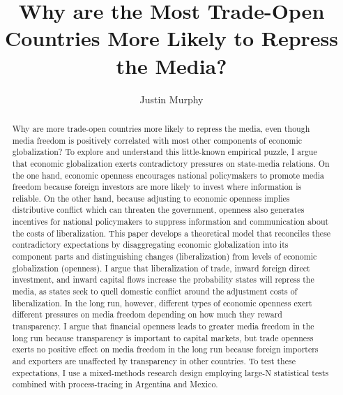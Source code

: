 \documentclass[12pt,a4paper]{article}\usepackage[]{graphicx}\usepackage[]{color}
\begin{document}
\title{Why are the Most Trade-Open Countries More Likely to Repress the Media?}

\author{Justin Murphy}

\maketitle

\begin{singlespace}
\begin{abstract}
Why are more trade-open countries more likely to repress the media, even though media freedom is positively correlated with most other components of economic globalization? To explore and understand this little-known empirical puzzle, I argue that economic globalization exerts contradictory pressures on state-media relations. On the one hand, economic openness encourages national policymakers to promote media freedom because foreign investors are more likely to invest where information is reliable. On the other hand, because adjusting to economic openness implies distributive conflict which can threaten the government, openness also generates incentives for national policymakers to suppress information and communication about the costs of liberalization. This paper develops a theoretical model that reconciles these contradictory expectations by disaggregating economic globalization into its component parts and distinguishing changes (liberalization) from levels of economic globalization (openness). I argue that liberalization of trade, inward foreign direct investment, and inward capital flows increase the probability states will repress the media, as states seek to quell domestic conflict around the adjustment costs of liberalization. In the long run, however, different types of economic openness exert different pressures on media freedom depending on how much they reward transparency. I argue that financial openness leads to greater media freedom in the long run because transparency is important to capital markets, but trade openness exerts no positive effect on media freedom in the long run because foreign importers and exporters are unaffected by transparency in other countries. To test these expectations, I use a mixed-methods research design employing large-N statistical tests combined with process-tracing in Argentina and Mexico.
\end{abstract}
\end{singlespace}

\vspace{0.3cm}
\end{document}
